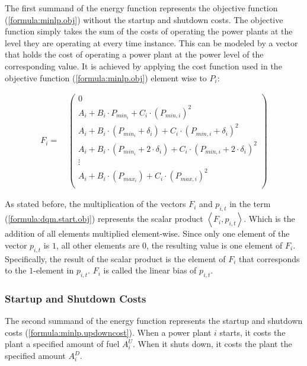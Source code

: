 The first summand of the energy function represents the objective function (\ref{formula:minlp.obj}) without the startup and shutdown costs.
The objective function simply takes the sum of the costs of operating the power plants at the level they are operating at every time instance.
This can be modeled by a vector that holds the cost of operating a power plant at the power level of the corresponding value.
It is achieved by applying the cost function used in the objective function (\ref{formula:minlp.obj}) element wise to $P_i$:

\begin{align}
  F_i = \quad \begin{pmatrix}
    0 \\
    A_i + B_i \cdot P_{min_i} + C_i \cdot \left( P_{min, i} \right)^2 \\
    A_i + B_i \cdot \left( P_{min_i} + \delta_i \right) + C_i \cdot \left( P_{min, i} + \delta_i \right)^2 \\
    A_i + B_i \cdot \left( P_{min_i} + 2 \cdot \delta_i \right) + C_i \cdot \left( P_{min, i} + 2 \cdot \delta_i \right)^2 \\
    \vdots \\
    A_i + B_i \cdot \left( P_{max_i} \right) + C_i \cdot \left( P_{max, i} \right)^2 \\
  \end{pmatrix}
\end{align}

As stated before, the multiplication of the vectors $F_i$ and $p_{i, t}$ in the term (\ref{formula:dqm.start.obj}) represents the scalar product $\left\langle F_i, p_{i, t} \right\rangle$.
Which is the addition of all elements multiplied element-wise.
Since only one element of the vector $p_{i, t}$ is $1$, all other elements are $0$, the resulting value is one element of $F_i$.
Specifically, the result of the scalar product is the element of $F_i$ that corresponds to the $1$-element in $p_{i, t}$.
$F_i$ is called the linear bias of $p_{i, t}$.

\subsubsection{Startup and Shutdown Costs}

The second summand of the energy function represents the startup and shutdown costs (\ref{formula:minlp.updowncost}).
When a power plant $i$ starts, it costs the plant a specified amount of fuel $A_i^U$.
When it shuts down, it costs the plant the specified amount $A_i^D$.

